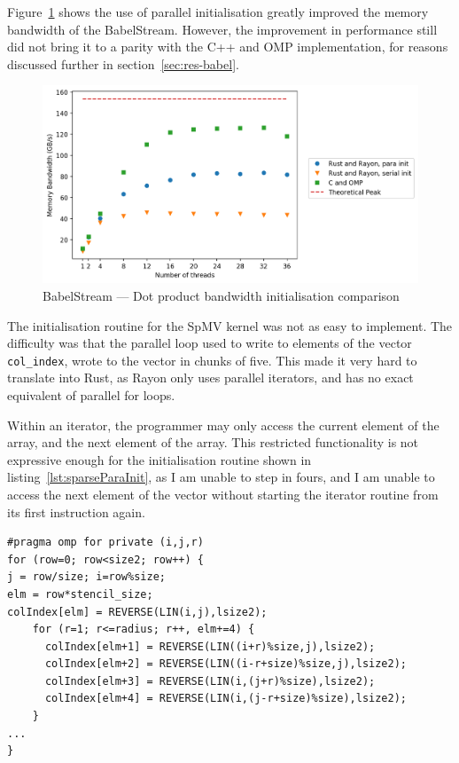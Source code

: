 Figure~\ref{fig:babel-dot-init} shows the use of parallel initialisation greatly improved the memory bandwidth of the BabelStream. However, the improvement in performance still did not bring it to a parity with the C++ and OMP implementation, for reasons discussed further in section~\ref{sec:res-babel}.

\begin{figure}[H]
    \centering
    \includegraphics[width=.8\linewidth]{figs/babel/dot-init.png}
    \caption{BabelStream --- Dot product bandwidth initialisation comparison}
    \label{fig:babel-dot-init}
\end{figure}


The initialisation routine for the SpMV kernel was not as easy to implement. The difficulty was that the parallel loop used to write to elements of the vector \texttt{col\_index}, wrote to the vector in chunks of five. This made it very hard to translate into Rust, as Rayon only uses parallel iterators, and has no exact equivalent of parallel for loops.

Within an iterator, the programmer may only access the current element of the array, and the next element of the array. This restricted functionality is not expressive enough for the initialisation routine shown in listing~\ref{lst:sparseParaInit}, as I am unable to step in fours, and I am unable to access the next element of the vector without starting the iterator routine from its first instruction again.


\begin{code}
\begin{verbatim}
#pragma omp for private (i,j,r)
for (row=0; row<size2; row++) {
j = row/size; i=row%size;
elm = row*stencil_size;
colIndex[elm] = REVERSE(LIN(i,j),lsize2);
    for (r=1; r<=radius; r++, elm+=4) {
      colIndex[elm+1] = REVERSE(LIN((i+r)%size,j),lsize2);
      colIndex[elm+2] = REVERSE(LIN((i-r+size)%size,j),lsize2);
      colIndex[elm+3] = REVERSE(LIN(i,(j+r)%size),lsize2);
      colIndex[elm+4] = REVERSE(LIN(i,(j-r+size)%size),lsize2);
    }
...
}
\end{verbatim}
\label{lst:sparseParaInit}
\end{code}

